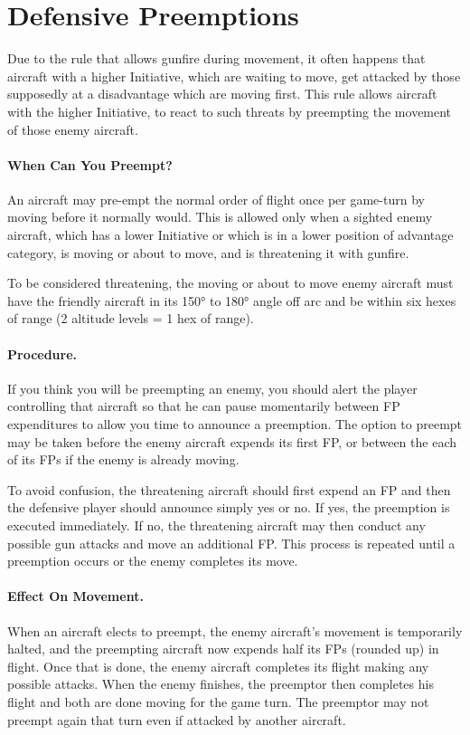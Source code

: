 \section
{Defensive Preemptions}

Due to the rule that allows gunfire during movement, it often happens that aircraft with a higher Initiative, which are waiting to move, get attacked by those supposedly at a disadvantage which are moving first. This rule allows aircraft with the higher Initiative, to react to such threats by preempting the movement of those enemy aircraft.

\paragraph{When Can You Preempt?} An aircraft may pre-empt the normal order of flight once per game-turn by moving before it normally would. This is allowed only when a sighted enemy aircraft, which has a lower Initiative or which is in a lower position of advantage category, is moving or about to move, and is threatening it with gunfire.

To be considered threatening, the moving or about to move enemy aircraft must have the friendly aircraft in its 150° to 180° angle off arc and be within six hexes of range (2 altitude levels = 1 hex of range).

\paragraph{Procedure.} If you think you will be preempting an enemy, you should alert the player controlling that aircraft so that he can pause momentarily between FP expenditures to allow you time to announce a preemption. The option to preempt may be taken before the enemy aircraft expends its first FP, or between the each of its FPs if the enemy is already moving.

To avoid confusion, the threatening aircraft should first expend an FP and then the defensive player should announce simply yes or no. If yes, the preemption is executed immediately. If no, the threatening aircraft may then conduct any possible gun attacks and move an additional FP. This process is repeated until a preemption occurs or the enemy completes its move.

\paragraph{Effect On Movement.} When an aircraft elects to preempt, the enemy aircraft's movement is temporarily halted, and the preempting aircraft now expends half its FPs (rounded up) in flight. Once that is done, the enemy aircraft completes its flight making any possible attacks. When the enemy finishes, the preemptor then completes his flight and both are done moving for the game turn. The preemptor may not preempt again that turn even if attacked by another aircraft.

